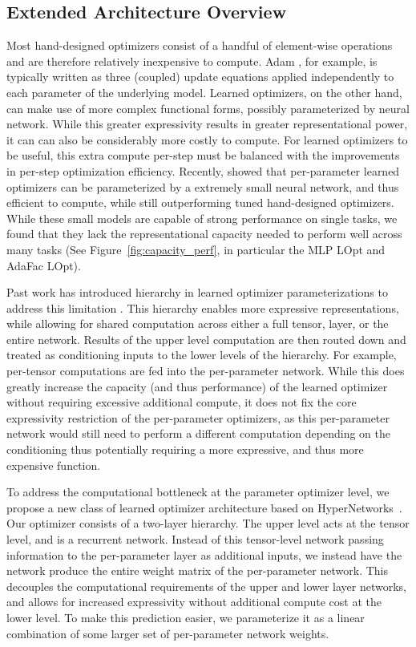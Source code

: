 \documentclass[11pt]{article}
\begin{document}
\subsection{Extended Architecture Overview}
Most hand-designed optimizers consist of a handful of element-wise operations and are therefore relatively inexpensive to compute.
Adam \citep{kingma2014adam}, for example, is typically written as three (coupled) update equations applied independently to each parameter of the underlying model.
Learned optimizers, on the other hand, can make use of more complex functional forms, possibly parameterized by neural network.
While this greater expressivity results in greater representational power, it can can also be considerably more costly to compute.
For learned optimizers to be useful, this extra compute per-step must be balanced with the improvements in per-step optimization efficiency.
Recently, \citet{metz2022practical} showed that per-parameter learned optimizers can be parameterized by a extremely small neural network, and thus efficient to compute, while still outperforming tuned hand-designed optimizers.
While these small models are capable of strong performance on single tasks, we found that they lack the representational capacity needed to perform well across many tasks (See Figure~\ref{fig:capacity_perf}, in particular the MLP LOpt and AdaFac LOpt).

Past work has introduced hierarchy in learned optimizer parameterizations to address this limitation \citep{wichrowska2017learned, metz2020tasks}.
This hierarchy enables more expressive representations, while allowing for shared computation across either a full tensor, layer, or the entire network. 
Results of the upper level computation are then routed down and treated as conditioning inputs to the lower levels of the hierarchy.
For example, per-tensor computations are fed into the per-parameter network.
While this does greatly increase the capacity (and thus performance) of the learned optimizer without requiring excessive additional compute, it does not fix the core expressivity restriction of the per-parameter optimizers, as this per-parameter network would still need to perform a different computation depending on the conditioning thus potentially requiring a more expressive, and thus more expensive function.

To address the computational bottleneck at the parameter optimizer level, we propose a new class of learned optimizer architecture based on HyperNetworks~\citep{ha2016hypernetworks}.
Our optimizer consists of a two-layer hierarchy. 
The upper level acts at the tensor level, and is a recurrent network.
Instead of this tensor-level network passing information to the per-parameter layer as additional inputs, we instead have the network produce the entire weight matrix of the per-parameter network. 
This decouples the computational requirements of the upper and lower layer networks, and allows for increased expressivity without additional compute cost at the lower level.
To make this prediction easier, we parameterize it as a linear combination of some larger set of per-parameter network weights.
\end{document}
